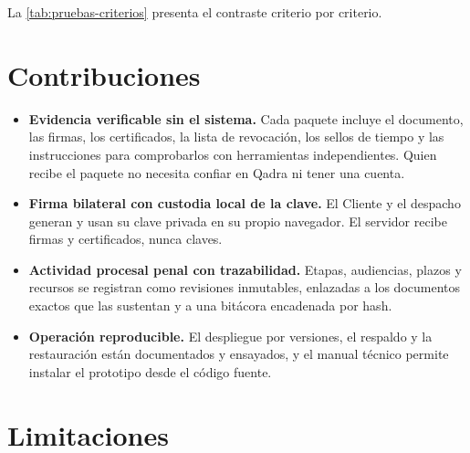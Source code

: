 La \cref{tab:pruebas-criterios} presenta el contraste criterio por criterio.

\section{Contribuciones}\label{sec:contribuciones}

\begin{itemize}
  \item \textbf{Evidencia verificable sin el sistema.} Cada paquete incluye el
        documento, las firmas, los certificados, la lista de revocación, los
        sellos de tiempo y las instrucciones para comprobarlos con herramientas
        independientes. Quien recibe el paquete no necesita confiar en Qadra ni
        tener una cuenta.
  \item \textbf{Firma bilateral con custodia local de la clave.} El Cliente y
        el despacho generan y usan su clave privada en su propio navegador. El
        servidor recibe firmas y certificados, nunca claves.
  \item \textbf{Actividad procesal penal con trazabilidad.} Etapas, audiencias,
        plazos y recursos se registran como revisiones inmutables, enlazadas a
        los documentos exactos que las sustentan y a una bitácora encadenada
        por hash.
  \item \textbf{Operación reproducible.} El despliegue por versiones, el
        respaldo y la restauración están documentados y ensayados, y el manual
        técnico permite instalar el prototipo desde el código fuente.
\end{itemize}

\section{Limitaciones}\label{sec:limitaciones}

